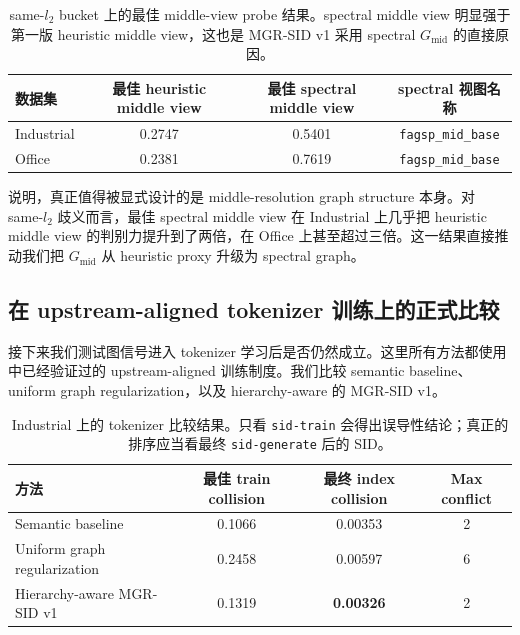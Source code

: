 \begin{table}[t]
  \centering
  \caption{same-$l_2$ bucket 上的最佳 middle-view probe 结果。spectral middle view 明显强于第一版 heuristic middle view，这也是 MGR-SID v1 采用 spectral $G_{\mathrm{mid}}$ 的直接原因。}
  \label{tab:probe}
  \begin{tabular}{lccc}
    \toprule
    数据集 & 最佳 heuristic middle view & 最佳 spectral middle view & spectral 视图名称 \\
    \midrule
    Industrial & 0.2747 & 0.5401 & \texttt{fagsp\_mid\_base} \\
    Office & 0.2381 & 0.7619 & \texttt{fagsp\_mid\_base} \\
    \bottomrule
  \end{tabular}
\end{table}

 说明，真正值得被显式设计的是 middle-resolution graph structure 本身。对 same-$l_2$ 歧义而言，最佳 spectral middle view 在 Industrial 上几乎把 heuristic middle view 的判别力提升到了两倍，在 Office 上甚至超过三倍。这一结果直接推动我们把 $G_{\mathrm{mid}}$ 从 heuristic proxy 升级为 spectral graph。

\subsection{在 upstream-aligned tokenizer 训练上的正式比较}

接下来我们测试图信号进入 tokenizer 学习后是否仍然成立。这里所有方法都使用  中已经验证过的 upstream-aligned 训练制度。我们比较 semantic baseline、uniform graph regularization，以及 hierarchy-aware 的 MGR-SID v1。

\begin{table}[t]
  \centering
  \caption{Industrial 上的 tokenizer 比较结果。只看 \texttt{sid-train} 会得出误导性结论；真正的排序应当看最终 \texttt{sid-generate} 后的 SID。}
  \label{tab:main}
  \begin{tabular}{lccc}
    \toprule
    方法 & 最佳 train collision & 最终 index collision & Max conflict \\
    \midrule
    Semantic baseline & 0.1066 & 0.00353 & 2 \\
    Uniform graph regularization & 0.2458 & 0.00597 & 6 \\
    Hierarchy-aware MGR-SID v1 & 0.1319 & \textbf{0.00326} & 2 \\
    \bottomrule
  \end{tabular}
\end{table}


